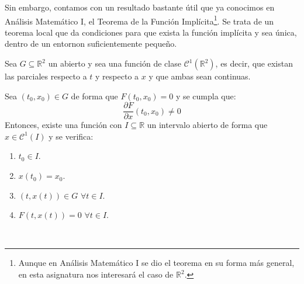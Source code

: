 Sin embargo, contamos con un resultado bastante útil que ya conocimos en Análisis Matemático I, el Teorema de la Función Implícita\footnote{Aunque en Análisis Matemático I se dio el teorema en su forma más general, en esta asignatura nos interesará el caso de $\mathbb{R}^2$.}. Se trata de un teorema local que da condiciones para que exista la función implícita y sea única, dentro de un entornon suficientemente pequeño.

\begin{teo}
    Sea $G\subseteq \mathbb{R}^2$ un abierto y sea
    una función de clase $\mathcal{C}^1(\mathbb{R}^2)$, es decir, que existan las parciales respecto a $t$ y respecto a $x$ y que ambas sean continuas.

    \noindent
    Sea $(t_0,x_0)\in G$ de forma que $F(t_0,x_0)=0$ y se cumpla que:
    \begin{equation*}
        \dfrac{\partial F}{\partial x}(t_0,x_0) \neq 0
    \end{equation*}
    Entonces, existe una función 
    con $I\subseteq \mathbb{R}$ un intervalo abierto de forma que $x\in \mathcal{C}^1(I)$ y se verifica:
    \begin{enumerate}
        \item $t_0 \in I$.
        \item $x(t_0) = x_0$.
        \item $(t,x(t))\in G$ $\forall t\in I$.
        \item $F(t,x(t))=0$ $\forall t\in I$.
    \end{enumerate}
\end{teo}~\\

%
%

